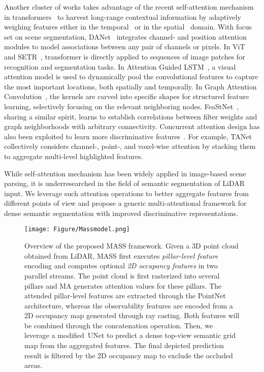 \documentclass[lettersize,journal]{IEEEtran}
\begin{document}
Another cluster of works takes advantage of the recent self-attention mechanism in transformers~\cite{attention} to harvest long-range contextual information by adaptively weighing features either in the temporal~\cite{attention} or in the spatial~\cite{omnirange,danet} domain.
With focus set on scene segmentation, DANet~\cite{danet} integrates channel- and position attention modules to model associations between any pair of channels or pixels.
In ViT~\cite{vision_transformer} and SETR~\cite{setr}, transformer is directly applied to sequences of image patches for recognition and segmentation tasks.
In Attention Guided LSTM~\cite{spatio_temporal_lstm}, a visual attention model is used to dynamically pool the convolutional features to capture the most important locations, both spatially and temporally.
In Graph Attention Convolution~\cite{graph_attention_convolution}, the kernels are carved into specific shapes for structured feature learning, selectively focusing on the relevant neighboring nodes.
FeaStNet~\cite{feastnet}, sharing a similar spirit, learns to establish correlations between filter weights and graph neighborhoods with arbitrary connectivity.
Concurrent attention design has also been exploited to learn more discriminative features~\cite{omnirange,danet,tanet}.
For example, TANet~\cite{tanet} collectively considers channel-, point-, and voxel-wise attention by stacking them to aggregate multi-level highlighted features. 

While self-attention mechanism has been widely applied in image-based scene parsing, it is underresearched in the field of semantic segmentation of LiDAR input.
We leverage such attention operations to better aggregate features from different points of view and propose a generic multi-attentional framework for dense semantic segmentation with improved discriminative representations.

\begin{figure*}[!t]
\begin{center}
\texttt{[image: Figure/Massmodel.png]}
\end{center}
\caption{Overview of the proposed \mbox{MASS} framework.
Given a 3D point cloud obtained from LiDAR, \mbox{MASS} first executes \emph{pillar-level feature} encoding and computes optional \emph{2D occupancy features} in two parallel streams. 
The point cloud is first rasterized into several pillars and MA generates attention values for these pillars.
The attended pillar-level features are extracted through the PointNet~\cite{pointnet} architecture,
whereas the observability features are encoded from a 2D occupancy map generated through ray casting. Both features will be combined through the concatenation operation.
Then, we leverage a \mbox{modified UNet} to predict a dense top-view semantic grid map from the aggregated features. The final depicted prediction result is filtered by the 2D occupancy map to exclude the occluded areas.
}
\label{fig:pipeline}
\end{figure*}
\end{document}
